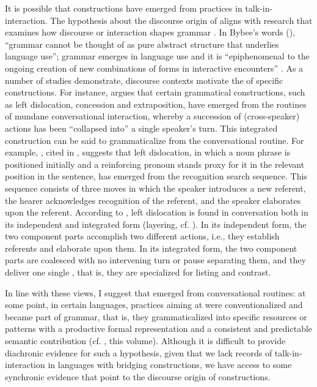 \documentclass[output=paper]{LSP/langsci}
\begin{document}
It is possible that  constructions have emerged from  practices in talk-in-interaction. The hypothesis about the discourse origin of  aligns with research that examines how discourse or interaction shapes grammar \citep{givon79,hopper80,ochs96,Selting01}. In Bybee’s words (\citeyear[][730]{bybee.2006}), ``grammar cannot be thought of as pure abstract structure that underlies language use''; grammar emerges in language use and it is ``epiphenomenal to the ongoing creation of new combinations of forms in interactive encounters'' \citep[][26]{hopper11}. As a number of studies \citep{couper11,gipper11,blythe.2013} demonstrate, discourse contexts motivate the  of specific constructions. For instance, \citet{couper11} argues that certain grammatical constructions, such as left dislocation, concession and extraposition, have emerged from the  routines of mundane conversational interaction, whereby a succession of (cross-speaker) actions has been ``collapsed into'' a single speaker’s turn. This integrated construction can be said to grammaticalize from the conversational routine. For example, \citet{geluykens92}, cited in \citet{couper11}, suggests that left dislocation, in which a noun phrase is positioned initially and a reinforcing pronoun stands proxy for it in the relevant position in the sentence, has emerged from the recognition search sequence. This sequence consists of three moves in which the speaker introduces a new referent, the hearer acknowledges recognition of the referent, and the speaker elaborates upon the referent. According to \citet[][429]{couper11}, left dislocation is found in  conversation both in its independent and integrated form (layering, cf. \citealt{hopper91}). In its independent form, the two component parts accomplish two different actions, i.e., they establish referents and elaborate upon them. In its integrated form, the two component parts are coalesced with no intervening turn or pause separating them, and they deliver one single , that is, they are specialized for listing and contrast. 

In line with these views, I suggest that  emerged from conversational routines: at some point, in certain languages,  practices aiming at  were conventionalized and became part of grammar, that is, they grammaticalized into specific resources or patterns with a productive formal representation and a consistent and predictable semantic contribution (cf. \citealt{guerin18}, this volume). Although it is difficult to provide diachronic evidence for such a hypothesis, given that we lack records of talk-in-interaction in languages with bridging constructions, we have access to some synchronic evidence that point to the discourse origin of  constructions. 
\end{document}
